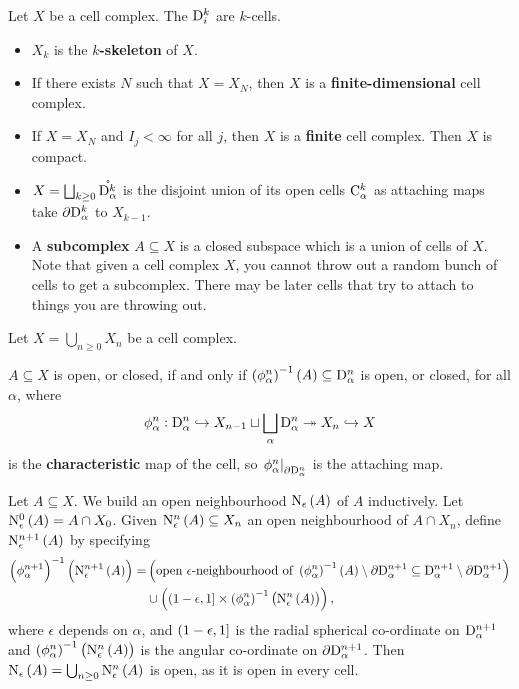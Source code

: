 \begin{notation*}
Let $ X $ be a cell complex. The $ \mathrm{D}_i^k $ are $ k $-cells.
\begin{itemize}
\item $ X_k $ is the \textbf{$ k $-skeleton} of $ X $.
\item If there exists $ N $ such that $ X = X_N $, then $ X $ is a \textbf{finite-dimensional} cell complex.
\item If $ X = X_N $ and $ I_j < \infty $ for all $ j $, then $ X $ is a \textbf{finite} cell complex. Then $ X $ is compact.
\item $ X = \bigsqcup_{k \ge 0} \mathring{\mathrm{D}_\alpha^k} $ is the disjoint union of its open cells $ \mathrm{C}_\alpha^k $ as attaching maps take $ \partial\mathrm{D}_\alpha^k $ to $ X_{k - 1} $.
\item A \textbf{subcomplex} $ A \subseteq X $ is a closed subspace which is a union of cells of $ X $. Note that given a cell complex $ X $, you cannot throw out a random bunch of cells to get a subcomplex. There may be later cells that try to attach to things you are throwing out.
\end{itemize}
\end{notation*}

Let $ X = \bigcup_{n \ge 0} X_n $ be a cell complex.

\begin{exercise*}
$ A \subseteq X $ is open, or closed, if and only if $ \br{\phi_\alpha^n}^{-1}\br{A} \subseteq \D_\alpha^n $ is open, or closed, for all $ \alpha $, where
$$ \phi_\alpha^n : \mathrm{D}_\alpha^n \hookrightarrow X_{n - 1} \sqcup \bigsqcup_\alpha \mathrm{D}_\alpha^n \twoheadrightarrow X_n \hookrightarrow X $$
is the \textbf{characteristic} map of the cell, so $ \left. \phi_\alpha^n \right|_{\partial\mathrm{D}_\alpha^n} $ is the attaching map.
\end{exercise*}

\pagebreak

Let $ A \subseteq X $. We build an open neighbourhood $ \N_\epsilon\br{A} $ of $ A $ inductively. Let $ \N_\epsilon^0\br{A} = A \cap X_0 $. Given $ \N_\epsilon^n\br{A} \subseteq X_n $ an open neighbourhood of $ A \cap X_n $, define $ \N_\epsilon^{n + 1}\br{A} $ by specifying
\begin{align*}
\br{\phi_\alpha^{n + 1}}^{-1}\br{\N_\epsilon^{n + 1}\br{A}}
= & \br{\text{open $ \epsilon $-neighbourhood of} \ \br{\phi_\alpha^n}^{-1}\br{A} \setminus \da\D_\alpha^{n + 1} \subseteq \D_\alpha^{n + 1} \setminus \da\D_\alpha^{n + 1}} \\
& \cup \br{\intoc{1 - \epsilon, 1} \times \br{\phi_\alpha^n}^{-1}\br{\N_\epsilon^n\br{A}}},
\end{align*}
where $ \epsilon $ depends on $ \alpha $, and $ \intoc{1 - \epsilon, 1} $ is the radial spherical co-ordinate on $ \mathrm{D}_\alpha^{n + 1} $ and $ \br{\phi_\alpha^n}^{-1}\br{\N_\epsilon^n\br{A}} $ is the angular co-ordinate on $ \partial\mathrm{D}_\alpha^{n + 1} $. Then $ \N_\epsilon\br{A} = \bigcup_{n \ge 0} \N_\epsilon^n\br{A} $ is open, as it is open in every cell.


